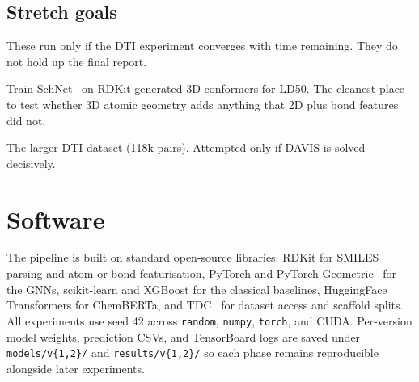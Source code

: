 \documentclass[a4paper,11pt]{article}
\begin{document}
\subsection{Stretch goals}

These run only if the DTI experiment converges with time remaining. They do not hold up the final report.

\begin{description}[leftmargin=1.5em, style=nextline]
\item[Level 4 (SchNet on LD50).] Train SchNet~\cite{schnet} on RDKit-generated 3D conformers for LD50. The cleanest place to test whether 3D atomic geometry adds anything that 2D plus bond features did not.
\item[KIBA.] The larger DTI dataset (118k pairs). Attempted only if DAVIS is solved decisively.
\end{description}

\section*{Software}

The pipeline is built on standard open-source libraries: RDKit for SMILES parsing and atom or bond featurisation, PyTorch and PyTorch Geometric~\cite{fey2019} for the GNNs, scikit-learn and XGBoost for the classical baselines, HuggingFace Transformers for ChemBERTa, and TDC~\cite{huang2021} for dataset access and scaffold splits. All experiments use seed 42 across \texttt{random}, \texttt{numpy}, \texttt{torch}, and CUDA. Per-version model weights, prediction CSVs, and TensorBoard logs are saved under \texttt{models/v\{1,2\}/} and \texttt{results/v\{1,2\}/} so each phase remains reproducible alongside later experiments.
\end{document}
